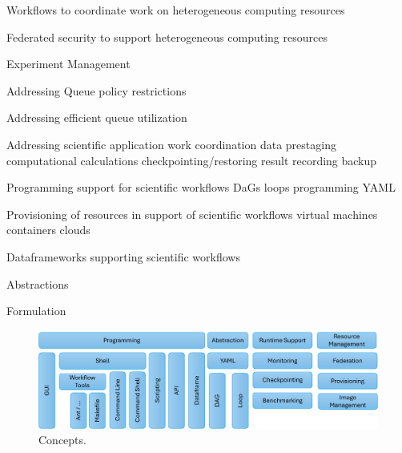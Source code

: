 \documentclass[utf8]{FrontiersinVancouver} %
\begin{document}
Workflows to coordinate work on heterogeneous computing resources

Federated security to support heterogeneous computing resources

Experiment Management

Addressing  Queue policy restrictions

Addressing efficient queue utilization

Addressing scientific application work coordination
    data prestaging
    computational calculations
    checkpointing/restoring
    result recording
    backup

Programming support for scientific workflows
    DaGs
    loops
    programming
    YAML
    
Provisioning of resources in support of scientific workflows
    virtual machines
    containers
    clouds

Dataframeworks supporting scientific workflows

Abstractions

Formulation



\begin{figure}[htb]
    \centering
    \includegraphics[width=0.70\columnwidth]{images/concepts}
    \caption{Concepts.}
    \label{fig:concepts}
\end{figure}
\end{document}
